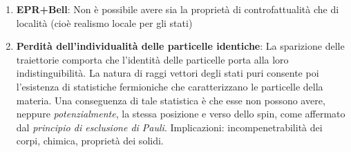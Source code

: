 \documentclass[../../FisicaTeorica.tex]{subfiles}
\begin{document}
\begin{enumerate}
\item \textbf{EPR+Bell}: Non è possibile avere sia la proprietà di controfattualità che di località (cioè realismo locale per gli stati)
\item \textbf{Perdità dell'individualità delle particelle identiche}: La sparizione delle traiettorie comporta che l'identità delle particelle porta alla loro indistinguibilità. La natura di raggi vettori degli stati puri consente poi l'esistenza di statistiche fermioniche che caratterizzano le particelle della materia. Una conseguenza di tale statistica è che esse non possono avere, neppure \textit{potenzialmente}, la stessa posizione e verso dello spin, come affermato dal \textit{principio di esclusione di Pauli}. Implicazioni: incompenetrabilità dei corpi, chimica, proprietà dei solidi.
\end{enumerate}
\end{document}
